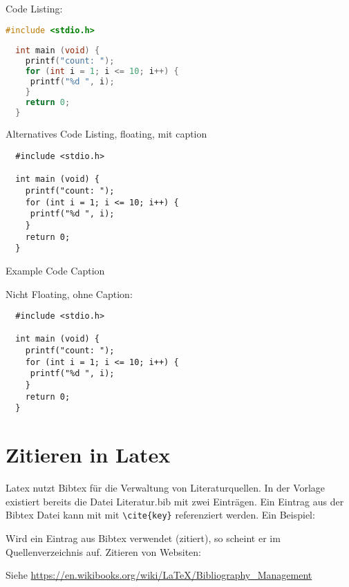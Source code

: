 Code Listing:
\begin{lstlisting}[language=C++,caption=Example Code	]
  #include <stdio.h>
  
  int main (void) {
    printf("count: ");
    for (int i = 1; i <= 10; i++) {
     printf("%d ", i);
    }
    return 0;
  }
\end{lstlisting}


\bigskip
Alternatives Code Listing, floating, mit caption

\begin{listing}[H]
 \begin{verbatim}
  #include <stdio.h>
  
  int main (void) {
    printf("count: ");
    for (int i = 1; i <= 10; i++) {
     printf("%d ", i);
    }
    return 0;
  }
  \end{verbatim}
  \caption{Example Code Caption}
\end{listing}

\bigskip 

Nicht Floating, ohne Caption:
\begin{verbatim}
  #include <stdio.h>
  
  int main (void) {
    printf("count: ");
    for (int i = 1; i <= 10; i++) {
     printf("%d ", i);
    }
    return 0;
  }
\end{verbatim}



\section{Zitieren in Latex}
Latex nutzt Bibtex für die Verwaltung von Literaturquellen. In der Vorlage existiert bereits die Datei Literatur.bib mit zwei Einträgen. Ein Eintrag aus der Bibtex Datei kann mit mit \verb|\cite{key}| referenziert werden. Ein Beispiel: \cite{flegel}

Wird ein Eintrag aus Bibtex verwendet (zitiert), so scheint er im Quellenverzeichnis auf.
Zitieren von Websiten: \cite{htlwels}

Siehe \url{https://en.wikibooks.org/wiki/LaTeX/Bibliography_Management}
